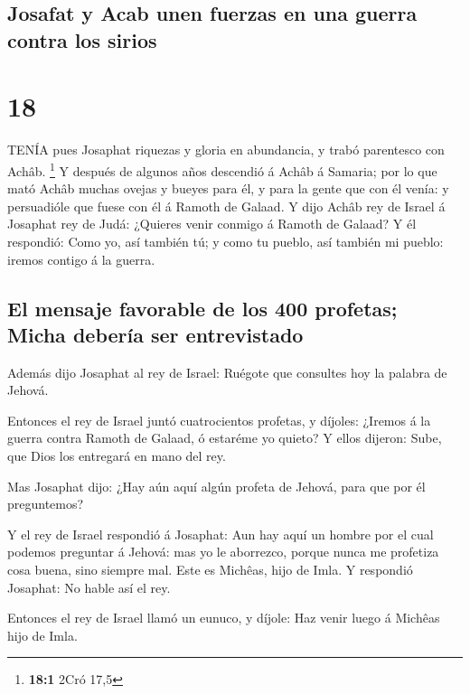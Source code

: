 \hypertarget{josafat-y-acab-unen-fuerzas-en-una-guerra-contra-los-sirios}{%
\subsection{Josafat y Acab unen fuerzas en una guerra contra los
sirios}\label{josafat-y-acab-unen-fuerzas-en-una-guerra-contra-los-sirios}}

\hypertarget{section-17}{%
\section{18}\label{section-17}}

 TENÍA pues Josaphat riquezas y gloria en abundancia, y
trabó parentesco con Achâb. \footnote{\textbf{18:1} 2Cró 17,5}
 Y después de algunos años descendió á Achâb á Samaria; por
lo que mató Achâb muchas ovejas y bueyes para él, y para la gente que
con él venía: y persuadióle que fuese con él á Ramoth de Galaad.
 Y dijo Achâb rey de Israel á Josaphat rey de Judá: ¿Quieres
venir conmigo á Ramoth de Galaad? Y él respondió: Como yo, así también
tú; y como tu pueblo, así también mi pueblo: iremos contigo á la guerra.

\hypertarget{el-mensaje-favorable-de-los-400-profetas-micha-deberuxeda-ser-entrevistado}{%
\subsection{El mensaje favorable de los 400 profetas; Micha debería ser
entrevistado}\label{el-mensaje-favorable-de-los-400-profetas-micha-deberuxeda-ser-entrevistado}}

 Además dijo Josaphat al rey de Israel: Ruégote que
consultes hoy la palabra de Jehová.

 Entonces el rey de Israel juntó cuatrocientos profetas, y
díjoles: ¿Iremos á la guerra contra Ramoth de Galaad, ó estaréme yo
quieto? Y ellos dijeron: Sube, que Dios los entregará en mano del rey.

 Mas Josaphat dijo: ¿Hay aún aquí algún profeta de Jehová,
para que por él preguntemos?

 Y el rey de Israel respondió á Josaphat: Aun hay aquí un
hombre por el cual podemos preguntar á Jehová: mas yo le aborrezco,
porque nunca me profetiza cosa buena, sino siempre mal. Este es Michêas,
hijo de Imla. Y respondió Josaphat: No hable así el rey.

 Entonces el rey de Israel llamó un eunuco, y díjole: Haz
venir luego á Michêas hijo de Imla.

